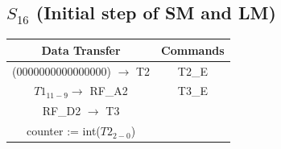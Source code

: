 \documentclass[]{report}
\begin{document}
            \subsection*{$S_{16}$ (Initial step of SM and LM)} %
            \begin{center}
                \begin{tabular}{|c|c|}
                    \hline
                    Data Transfer & Commands \\
                    \hline
                    (0000000000000000) $\to$ T2 & T2\_E\\
                    $T1_{11-9} \to$ RF\_A2 & T3\_E\\
                    RF\_D2 $\to$ T3 & \\
                    counter := int($T2_{2-0}$) & \\
                    \hline
                \end{tabular}
            \end{center}
\end{document}
